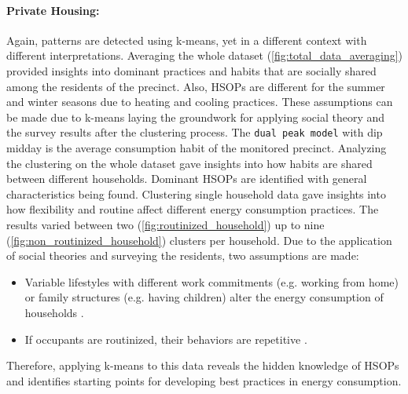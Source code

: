 \paragraph*{Private Housing:}
Again, patterns are detected using k-means, yet in a different context with different interpretations.
Averaging the whole dataset (\autoref{fig:total_data_averaging}) provided insights into dominant practices and habits that are socially shared among the residents of the precinct.
Also, HSOPs are different for the summer and winter seasons due to heating and cooling practices.
These assumptions can be made due to k-means laying the groundwork for applying social theory and the survey results after the clustering process.
The \texttt{dual peak model} with dip midday is the average consumption habit of the monitored precinct.
Analyzing the clustering on the whole dataset gave insights into how habits are shared between different households.
Dominant HSOPs are identified with general characteristics being found.
Clustering single household data gave insights into how flexibility and routine affect different energy consumption practices.
The results varied between two (\autoref{fig:routinized_household}) up to nine (\autoref{fig:non_routinized_household}) clusters per household.
Due to the application of social theories and surveying the residents, two assumptions are made:
\begin{itemize}
    \item Variable lifestyles with different work commitments (e.g. working from home) or family structures (e.g. having children) alter the energy consumption of households \cite{KUR-HBP}.
    \item If occupants are routinized, their behaviors are repetitive \cite{BRE-EWP}.
\end{itemize}
Therefore, applying k-means to this data reveals the hidden knowledge of HSOPs and identifies starting points for developing best practices in energy consumption.
